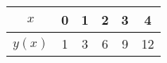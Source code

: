\begin{center}
\begin{tabular}{|c|c|c|c|c|c|}
\hline
$x$ & 0 & 1 & 2 & 3 & 4 \\
\hline
$y(x)$ & 1 & 3 & 6 & 9 & 12 \\
\hline
\end{tabular}
\end{center}
